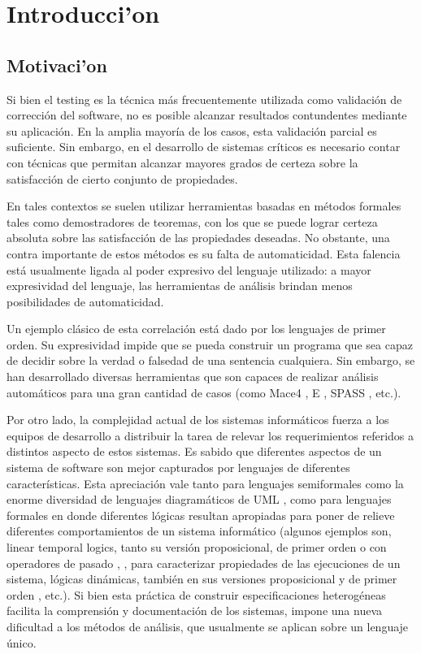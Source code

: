 \chapter{Introducci'on}
\section{Motivaci'on}

Si bien el testing es la técnica más frecuentemente utilizada como validación de corrección del software, no es posible alcanzar resultados contundentes mediante su aplicación. En la amplia mayoría de los casos, esta validación parcial es suficiente. Sin embargo, en el desarrollo de sistemas críticos es necesario contar con técnicas que permitan alcanzar mayores grados de certeza sobre la satisfacción de cierto conjunto de propiedades.

En tales contextos se suelen utilizar herramientas basadas en métodos formales tales como demostradores de teoremas, con los que se puede lograr certeza absoluta sobre las satisfacción de las propiedades deseadas. No obstante, una contra importante de estos métodos es su falta de automaticidad. Esta falencia está usualmente ligada al poder expresivo del lenguaje utilizado: a mayor expresividad del lenguaje, las herramientas de análisis brindan menos posibilidades de automaticidad.

Un ejemplo clásico de esta correlación está dado por los lenguajes de primer orden. Su expresividad impide que se pueda construir un programa que sea capaz de decidir sobre la verdad o falsedad de una sentencia cualquiera. Sin embargo, se han desarrollado diversas herramientas que son capaces de realizar análisis automáticos para una gran cantidad de casos (como Mace4 \cite{m05}, E \cite{s13}, SPASS \cite{WDFKSW09}, etc.). 

Por otro lado, la complejidad actual de los sistemas informáticos fuerza a los equipos de desarrollo a distribuir la tarea de relevar los requerimientos referidos a distintos aspecto de estos sistemas. Es sabido que diferentes aspectos de un sistema de software son mejor capturados por lenguajes de diferentes características. Esta apreciación vale tanto para lenguajes semiformales como la enorme diversidad de lenguajes diagramáticos de UML \cite{BRJ98}, como para lenguajes formales en donde diferentes lógicas resultan apropiadas para poner de relieve diferentes comportamientos de un sistema informático (algunos ejemplos son, linear temporal logics, tanto su versión proposicional, de primer orden o con operadores de pasado \cite{Pnu77}, \cite{MP95}, para caracterizar propiedades de las ejecuciones de un sistema, lógicas dinámicas, también en sus versiones proposicional y de primer orden \cite{HKT00}, etc.). Si bien esta práctica de construir especificaciones heterogéneas facilita la comprensión y documentación de los sistemas, impone una nueva dificultad a los métodos de análisis, que usualmente se aplican sobre un lenguaje único.

